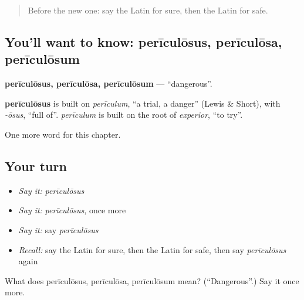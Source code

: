 \begin{quote}
Before the new one: say the Latin for sure, then the Latin for safe.
\end{quote}

\subsection*{You'll want to know: perīculōsus, perīculōsa, perīculōsum}
\textbf{perīculōsus, perīculōsa, perīculōsum} — \textquotedblleft{}dangerous\textquotedblright{}.

\begin{cousinweb}
\textbf{perīculōsus} is built on \emph{perīculum}, \textquotedblleft{}a trial, a danger\textquotedblright{} (Lewis \& Short), with \emph{-ōsus}, \textquotedblleft{}full of\textquotedblright{}. \emph{perīculum} is built on the root of \emph{experior}, \textquotedblleft{}to try\textquotedblright{}.
\end{cousinweb}

\begin{grammarlens}[title={What you've built}]
One more word for this chapter.
\end{grammarlens}

\subsection*{Your turn}
\begin{itemize}
\raggedright
  \item \emph{Say it:} \emph{perīculōsus}
  \item \emph{Say it:} \emph{perīculōsus}, once more
  \item \emph{Say it:} say \emph{perīculōsus}
  \item \emph{Recall:} say the Latin for sure, then the Latin for safe, then say \emph{perīculōsus} again
\end{itemize}

\begin{tcolorbox}[breakable,colback=teal!4,colframe=teal!35!black,title={Before you move on}]
What does perīculōsus, perīculōsa, perīculōsum mean? (\textquotedblleft{}Dangerous\textquotedblright{}.) Say it once more.
\end{tcolorbox}
